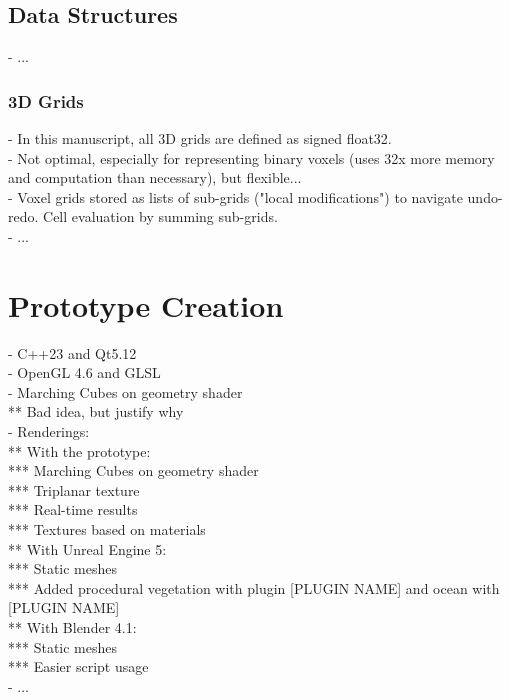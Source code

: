 \subsection{Data Structures}
- ...

\subsubsection{3D Grids}
- In this manuscript, all 3D grids are defined as signed float32. \\
- Not optimal, especially for representing binary voxels (uses 32x more memory and computation than necessary), but flexible... \\
- Voxel grids stored as lists of sub-grids ("local modifications") to navigate undo-redo. Cell evaluation by summing sub-grids. \\
- ...

\section{Prototype Creation}
\label{sec:introduction_prototype}
- C++23 and Qt5.12 \\
- OpenGL 4.6 and GLSL \\
- Marching Cubes on geometry shader \\
** Bad idea, but justify why \\
- Renderings: \\
** With the prototype: \\
*** Marching Cubes on geometry shader \\
*** Triplanar texture \\
*** Real-time results \\
*** Textures based on materials \\
** With Unreal Engine 5: \\
*** Static meshes \\
*** Added procedural vegetation with plugin [PLUGIN NAME] and ocean with [PLUGIN NAME] \\
** With Blender 4.1: \\
*** Static meshes \\
*** Easier script usage \\
- ...

